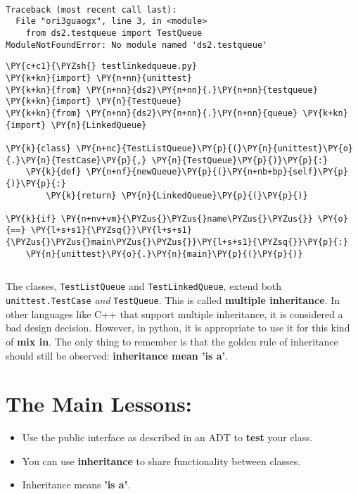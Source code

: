 \begin{Verbatim}

Traceback (most recent call last):
  File "ori3guaogx", line 3, in <module>
    from ds2.testqueue import TestQueue
ModuleNotFoundError: No module named 'ds2.testqueue'

\end{Verbatim}


\begin{Verbatim}[commandchars=\\\{\}]
\PY{c+c1}{\PYZsh{} testlinkedqueue.py}
\PY{k+kn}{import} \PY{n+nn}{unittest}
\PY{k+kn}{from} \PY{n+nn}{ds2}\PY{n+nn}{.}\PY{n+nn}{testqueue} \PY{k+kn}{import} \PY{n}{TestQueue}
\PY{k+kn}{from} \PY{n+nn}{ds2}\PY{n+nn}{.}\PY{n+nn}{queue} \PY{k+kn}{import} \PY{n}{LinkedQueue}

\PY{k}{class} \PY{n+nc}{TestListQueue}\PY{p}{(}\PY{n}{unittest}\PY{o}{.}\PY{n}{TestCase}\PY{p}{,} \PY{n}{TestQueue}\PY{p}{)}\PY{p}{:}
    \PY{k}{def} \PY{n+nf}{newQueue}\PY{p}{(}\PY{n+nb+bp}{self}\PY{p}{)}\PY{p}{:}
        \PY{k}{return} \PY{n}{LinkedQueue}\PY{p}{(}\PY{p}{)}

\PY{k}{if} \PY{n+nv+vm}{\PYZus{}\PYZus{}name\PYZus{}\PYZus{}} \PY{o}{==} \PY{l+s+s1}{\PYZsq{}}\PY{l+s+s1}{\PYZus{}\PYZus{}main\PYZus{}\PYZus{}}\PY{l+s+s1}{\PYZsq{}}\PY{p}{:}
    \PY{n}{unittest}\PY{o}{.}\PY{n}{main}\PY{p}{(}\PY{p}{)}
\end{Verbatim}

\begin{Verbatim}

\end{Verbatim}


The classes, \texttt{TestListQueue} and \texttt{TestLinkedQueue}, extend both \texttt{unittest.TestCase} \emph{and} \texttt{TestQueue}.
This is called \textbf{multiple inheritance}.
In other languages like C++ that support multiple inheritance, it is considered a bad design decision.
However, in python, it is appropriate to use it for this kind of \textbf{mix in}.
The only thing to remember is that the golden rule of inheritance should still be observed: \textbf{inheritance mean 'is a'}.

\section{The Main Lessons:}

\begin{itemize}

\item Use the public interface as described in an ADT to \textbf{test} your class.

\item You can use \textbf{inheritance} to share functionality between classes.

\item Inheritance means \textbf{'is a'}.

\end{itemize}

